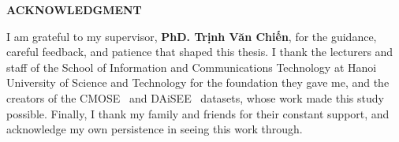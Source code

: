 \documentclass[../main.tex]{subfiles}
\begin{document}
\begin{center}
    \Large{\textbf{ACKNOWLEDGMENT}}\\
\end{center}
\vspace{1cm}

I am grateful to my supervisor, \textbf{PhD. Trịnh Văn Chiến}, for the guidance, careful feedback, and patience that shaped this thesis.
I thank the lecturers and staff of the School of Information and Communications Technology at Hanoi University of Science and Technology for the foundation they gave me, and the creators of the CMOSE~\cite{cmose} and DAiSEE~\cite{daisee} datasets, whose work made this study possible.
Finally, I thank my family and friends for their constant support, and acknowledge my own persistence in seeing this work through.
\end{document}

